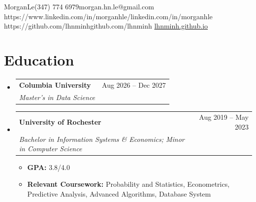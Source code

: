 \documentclass[a4paper,10pt]{article}
\makeatletter
\newcommand{\resumeItem}[1]{
  \item\small{{#1 \vspace{-2pt}}}
}
\newcommand{\resumeSubheading}[4]{
  \vspace{-2pt}\item
    \begin{tabular*}{0.97\textwidth}[t]{l@{\extracolsep{\fill}}r}
      \small\textbf{#1} & \small #2 \\
      \textit{\small #3} & \textit{\small #4} \\
    \end{tabular*}\vspace{-7pt}
}
\newcommand{\resumeSubHeadingListStart}{\begin{itemize}[leftmargin=0.15in,label={}]}
\newcommand{\resumeSubHeadingListEnd}{\end{itemize}}
\newcommand{\resumeItemListStart}{\begin{itemize}[leftmargin=0.22in]}
\newcommand{\resumeItemListEnd}{\end{itemize}\vspace{-5pt}}
\makeatother
\begin{document}
\resumeContactHeader
  {Morgan}{Le}{(347) 774 6979}{morgan.hn.le@gmail.com}
  {https://www.linkedin.com/in/morganhle/}{linkedin.com/in/morganhle}
  {https://github.com/lhnminh}{github.com/lhnminh}
  {\href{https://lhnminh.github.io/}{lhnminh.github.io}}

\section{Education}
\resumeSubHeadingListStart
  \resumeSubheading
    {Columbia University}{Aug 2026 -- Dec 2027}
    {Master's in Data Science}{}
  \resumeSubheading
    {University of Rochester}{Aug 2019 -- May 2023}
    {Bachelor in Information Systems \& Economics; Minor in Computer Science}{}
    \resumeItemListStart
      \resumeItem{{\bfseries GPA:} 3.8/4.0}
      \resumeItem{{\bfseries Relevant Coursework:} Probability and Statistics, Econometrics, Predictive Analysis, Advanced Algorithms, Database System}
    \resumeItemListEnd
\resumeSubHeadingListEnd
\end{document}

